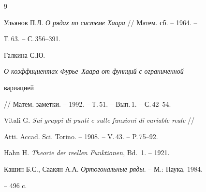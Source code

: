 \begin{thebibliography}{9}







Ульянов П.Л. {\em О рядах по системе Хаара} // Матем. сб. -- 1964. --


Т.\,63. -- С.\,356--391.




Галкина С.Ю. {\em О коэффициентах Фурье--Хаара от функций с ограниченной


вариацией} // Матем. заметки. -- 1992. -- Т.\,51. -- Вып.\,1. -- С.\,42--54.




Vitali G. {\em Sui gruppi di punti e sulle funzioni di variable reale} //


Atti. Accad. Sci. Torino. -- 1908. -- V.\,43. -- P.\,75--92.




Hahn H. {\em Theorie der reellen Funktionen}, Bd.~1. -- 1921.




Кашин Б.С., Саакян А.А. {\em Ортогональные ряды}. -- М.: Наука, 1984.


-- 496 c.





\end{thebibliography}





\vskip 2cm












\label{end}





